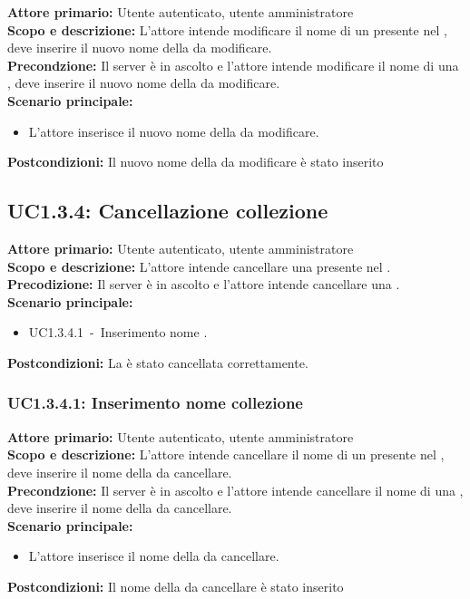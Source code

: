 \documentclass{scalatekids-article}
\begin{document}
\textbf{Attore primario:} Utente autenticato, utente amministratore\\
\textbf{Scopo e descrizione:} L'attore intende modificare il nome di un  presente nel , deve inserire il nuovo nome della  da modificare.\\
\textbf{Precondzione:} Il server è in ascolto e l'attore intende modificare il nome di una , deve inserire il nuovo nome della  da modificare.\\
\textbf{Scenario principale:}
\begin{itemize}
\item L'attore inserisce il nuovo nome della  da modificare.
\end{itemize}
\textbf{Postcondizioni:} Il nuovo nome della  da modificare è stato inserito

\subsection{UC1.3.4: Cancellazione collezione}

\textbf{Attore primario:} Utente autenticato, utente amministratore\\
\textbf{Scopo e descrizione:} L’attore intende cancellare una  presente nel .\\
\textbf{Precodizione:} Il server è in ascolto e l’attore intende cancellare una .\\
\textbf{Scenario principale:}
\begin{itemize}
\item UC1.3.4.1\ -\ Inserimento nome .
\end{itemize}
\textbf{Postcondizioni:} La  è stato cancellata correttamente.

\subsubsection{UC1.3.4.1: Inserimento nome collezione}

\textbf{Attore primario:} Utente autenticato, utente amministratore\\
\textbf{Scopo e descrizione:} L'attore intende cancellare il nome di un  presente nel , deve inserire il nome della  da cancellare.\\
\textbf{Precondzione:} Il server è in ascolto e l'attore intende cancellare il nome di una , deve inserire il nome della  da cancellare.\\
\textbf{Scenario principale:}
\begin{itemize}
\item L'attore inserisce il nome della  da cancellare.
\end{itemize}
\textbf{Postcondizioni:} Il nome della  da cancellare è stato inserito
\end{document}
